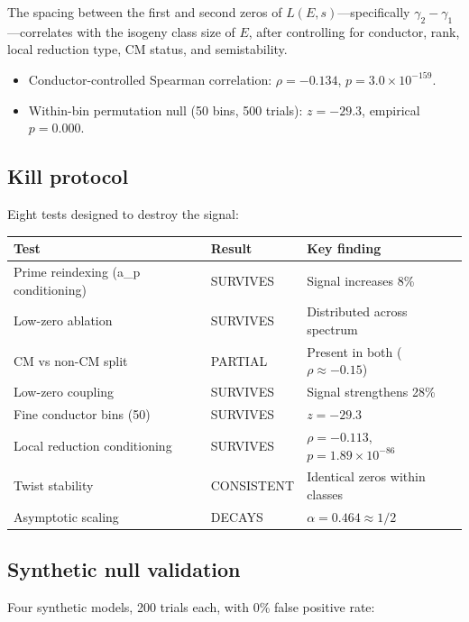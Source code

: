 \documentclass[11pt,a4paper]{article}
\begin{document}
The spacing between the first and second zeros of $L(E,s)$---specifically $\gamma_2 - \gamma_1$---correlates with the isogeny class size of $E$, after controlling for conductor, rank, local reduction type, CM status, and semistability.

\begin{itemize}[nosep]
  \item Conductor-controlled Spearman correlation: $\rho = -0.134$, $p = 3.0 \times 10^{-159}$.
  \item Within-bin permutation null (50 bins, 500 trials): $z = -29.3$, empirical $p = 0.000$.
\end{itemize}

\subsection{Kill protocol}

Eight tests designed to destroy the signal:

\begin{center}
\begin{tabular}{lll}
\toprule
\textbf{Test} & \textbf{Result} & \textbf{Key finding} \\
\midrule
Prime reindexing (a\_p conditioning) & SURVIVES & Signal increases 8\% \\
Low-zero ablation & SURVIVES & Distributed across spectrum \\
CM vs non-CM split & PARTIAL & Present in both ($\rho \approx -0.15$) \\
Low-zero coupling & SURVIVES & Signal strengthens 28\% \\
Fine conductor bins (50) & SURVIVES & $z = -29.3$ \\
Local reduction conditioning & SURVIVES & $\rho = -0.113$, $p = 1.89 \times 10^{-86}$ \\
Twist stability & CONSISTENT & Identical zeros within classes \\
Asymptotic scaling & DECAYS & $\alpha = 0.464 \approx 1/2$ \\
\bottomrule
\end{tabular}
\end{center}

\subsection{Synthetic null validation}

Four synthetic models, 200 trials each, with 0\% false positive rate:
\end{document}
